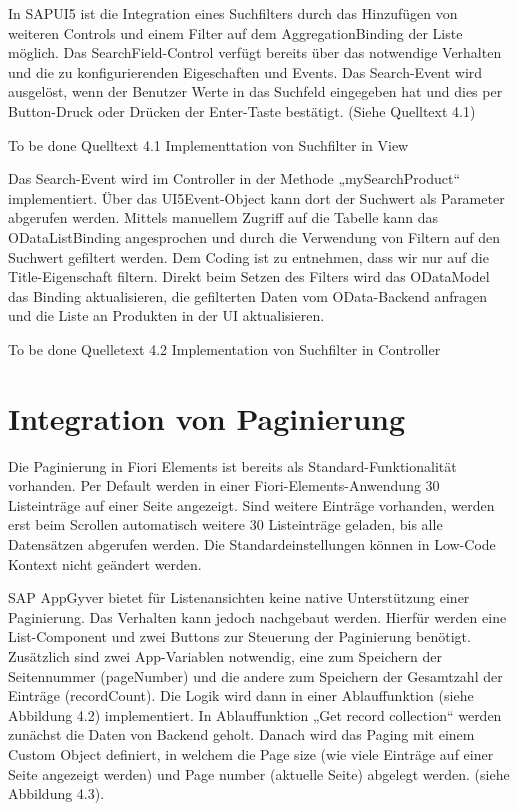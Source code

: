 In SAPUI5 ist die Integration eines Suchfilters durch das Hinzufügen von weiteren Controls und einem Filter auf dem AggregationBinding der Liste möglich. Das SearchField-Control verfügt bereits über das notwendige Verhalten und die zu konfigurierenden Eigeschaften und Events. Das Search-Event wird ausgelöst, wenn der Benutzer Werte in das Suchfeld eingegeben hat und dies per Button-Druck oder Drücken der Enter-Taste bestätigt. (Siehe Quelltext 4.1) 

To be done Quelltext 4.1 Implementtation von Suchfilter in View

Das Search-Event wird im Controller in der Methode „mySearchProduct“ implementiert. Über das UI5Event-Object kann dort der Suchwert als Parameter abgerufen werden. Mittels manuellem Zugriff auf die Tabelle kann das ODataListBinding angesprochen und durch die Verwendung von Filtern auf den Suchwert gefiltert werden. Dem Coding ist zu entnehmen, dass wir nur auf die Title-Eigenschaft filtern. Direkt beim Setzen des Filters wird das ODataModel das Binding aktualisieren, die gefilterten Daten vom OData-Backend anfragen und die Liste an Produkten in der UI aktualisieren.
 
To be done Quelletext 4.2 Implementation von Suchfilter in Controller

\section{Integration von Paginierung}

Die Paginierung in Fiori Elements ist bereits als Standard-Funktionalität vorhanden. Per Default werden in einer Fiori-Elements-Anwendung 30 Listeinträge auf einer Seite angezeigt. Sind weitere Einträge vorhanden, werden erst beim Scrollen automatisch weitere 30 Listeinträge geladen, bis alle Datensätzen abgerufen werden. Die Standardeinstellungen können in Low-Code Kontext nicht geändert werden.

SAP AppGyver bietet für Listenansichten keine native Unterstützung einer Paginierung. Das Verhalten kann jedoch nachgebaut werden. Hierfür werden eine List-Component und zwei Buttons zur Steuerung der Paginierung benötigt. Zusätzlich sind zwei App-Variablen notwendig, eine zum Speichern der Seitennummer (pageNumber) und die andere zum Speichern der Gesamtzahl der Einträge (recordCount). Die Logik wird dann in einer Ablauffunktion (siehe Abbildung 4.2) implementiert. In Ablauffunktion „Get record collection“ werden zunächst die Daten von Backend geholt. Danach wird das Paging mit einem Custom Object definiert, in welchem die Page size (wie viele Einträge auf einer Seite angezeigt werden) und Page number  (aktuelle Seite) abgelegt werden. (siehe Abbildung 4.3).

